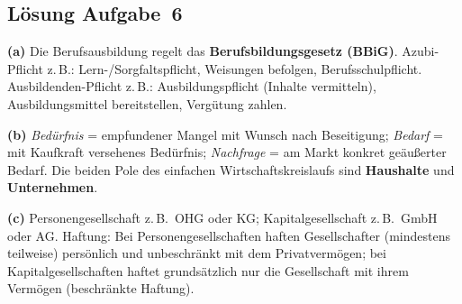 \documentclass[11pt, a4paper]{article}
\begin{document}
\subsection*{Lösung Aufgabe~6}
\begin{loesung}
\textbf{(a)} Die Berufsausbildung regelt das \textbf{Berufsbildungsgesetz (BBiG)}.
Azubi-Pflicht z.\,B.: Lern-/Sorgfaltspflicht, Weisungen befolgen, Berufsschulpflicht.
Ausbildenden-Pflicht z.\,B.: Ausbildungspflicht (Inhalte vermitteln), Ausbildungsmittel
bereitstellen, Vergütung zahlen.

\textbf{(b)} \emph{Bedürfnis} = empfundener Mangel mit Wunsch nach Beseitigung;
\emph{Bedarf} = mit Kaufkraft versehenes Bedürfnis; \emph{Nachfrage} = am Markt konkret
geäußerter Bedarf. Die beiden Pole des einfachen Wirtschaftskreislaufs sind
\textbf{Haushalte} und \textbf{Unternehmen}.

\textbf{(c)} Personengesellschaft z.\,B.\ OHG oder KG; Kapitalgesellschaft z.\,B.\ GmbH
oder AG. Haftung: Bei Personengesellschaften haften Gesellschafter (mindestens teilweise)
persönlich und unbeschränkt mit dem Privatvermögen; bei Kapitalgesellschaften haftet
grundsätzlich nur die Gesellschaft mit ihrem Vermögen (beschränkte Haftung).
\end{loesung}
\end{document}
